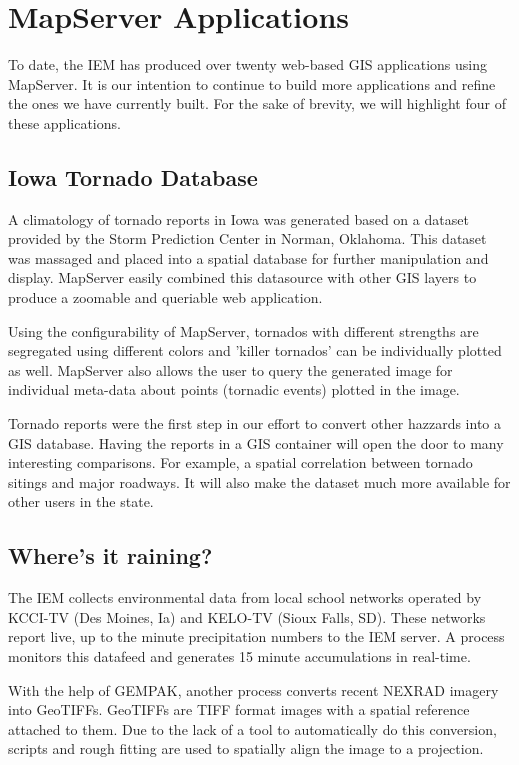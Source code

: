 \documentclass[twocolumn]{article}
\begin{document}
\section{MapServer Applications}

To date, the IEM has produced over twenty web-based GIS applications using 
MapServer.  It is our intention to continue to build more applications and
refine the ones we have currently built.  For the sake of brevity, we will
highlight four of these applications.

\subsection{Iowa Tornado Database}

A climatology of tornado reports in Iowa was generated based on a dataset 
provided by the Storm Prediction Center in Norman, Oklahoma.  This dataset was 
massaged and placed into a spatial database for further manipulation and 
display. MapServer easily combined this datasource with other GIS layers to 
produce a zoomable and queriable web application.

Using the configurability of MapServer, tornados with different strengths 
are segregated using different colors and 'killer tornados' can be 
individually plotted as well.  MapServer also allows the user to query 
the generated image for individual meta-data about points 
(tornadic events) plotted in the image.

Tornado reports were the first step in our effort to convert other hazzards
into a GIS database.  Having the reports in a GIS container will open the 
door to many interesting comparisons.  For example, a spatial correlation
between tornado sitings and major roadways.  It will also make the dataset
much more available for other users in the state.

\subsection{Where's it raining?}

The IEM collects environmental data from local school networks operated by
KCCI-TV (Des Moines, Ia) and KELO-TV (Sioux Falls, SD).  These networks report
live, up to the minute precipitation numbers to the IEM server.  A process
monitors this datafeed and generates 15 minute accumulations in real-time.

With the help of GEMPAK, another process converts recent NEXRAD imagery into
GeoTIFFs.  GeoTIFFs are TIFF format images with a spatial reference attached
to them.  Due to the lack of a tool to automatically do this conversion, 
scripts and rough fitting are used to spatially align the image to a projection.
\end{document}
